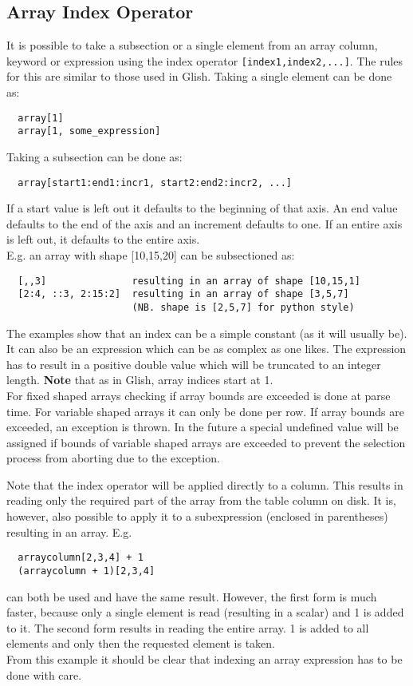 \subsection{\label{TAQL:INDEXING}Array Index Operator}
It is possible to take a subsection or a
single element from an array column, keyword or expression
using the index operator
\texttt{[index1,index2,...]}. The rules for this
are similar to those used in Glish.
Taking a single element can be done as:
\begin{verbatim}
  array[1]
  array[1, some_expression]
\end{verbatim}
Taking a subsection can be done as:
\begin{verbatim}
  array[start1:end1:incr1, start2:end2:incr2, ...]
\end{verbatim}
If a start value is left out it defaults to the beginning of
that axis. An end value defaults to the end of the axis and
an increment defaults to one. If an entire axis is left out,
it defaults to the entire axis.
\\E.g. an array with shape [10,15,20] can be subsectioned as:
\begin{verbatim}
  [,,3]               resulting in an array of shape [10,15,1]
  [2:4, ::3, 2:15:2]  resulting in an array of shape [3,5,7]
                      (NB. shape is [2,5,7] for python style)
\end{verbatim}
The examples show that an index can be a simple constant (as it will
usually be). It can also be an expression which can be as complex
as one likes. The expression has to result in a positive double value
which will be truncated to an integer length.
\textbf{Note} that as in Glish, array indices start at 1.
\\For fixed shaped arrays checking if array bounds are exceeded
is done at parse time.
For variable shaped arrays
it can only be done per row. If array bounds are exceeded,
an exception is thrown. In the future a special undefined value
will be assigned if bounds of variable shaped arrays are exceeded
to prevent the selection process from aborting due to the exception.

Note that the index operator will be applied directly
to a column. This results in reading only the required part of the
array from the table column on disk.
It is, however, also possible to apply it to a
subexpression (enclosed in parentheses) resulting in an array.
E.g.
\begin{verbatim}
  arraycolumn[2,3,4] + 1
  (arraycolumn + 1)[2,3,4]
\end{verbatim}
can both be used and have the same result. However, the first
form is much faster, because only a single element is read
(resulting in a scalar) and 1 is added to it.
The second form results in reading the entire array.
1 is added to all elements and only then the requested element is taken.
\\From this example it should be clear that indexing an array
expression has to be done with care.

